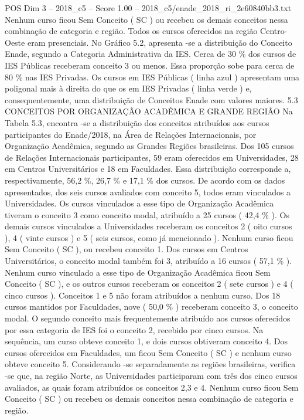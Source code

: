 \begin{textsample}{POS Dim 3 – 2018\_c5 – Score 1.00 – 2018\_c5/enade\_2018\_ri\_2e60840bb3.txt}
Nenhum curso ficou Sem Conceito ( SC ) ou recebeu os demais conceitos nessa combinação de categoria e região.
Todos os cursos oferecidos na região Centro-Oeste eram presenciais.
No Gráfico 5.2, apresenta -se a distribuição do Conceito Enade, segundo a Categoria Administrativa da IES.
Cerca de 30 \% dos cursos de IES Públicas receberam conceito 3 ou menos.
Essa proporção sobe para cerca de 80 \% nas IES Privadas.
Os cursos em IES Públicas ( linha azul ) apresentam uma poligonal mais à direita do que os em IES Privadas ( linha verde ) e, consequentemente, uma distribuição de Conceitos Enade com valores maiores. 5.3 CONCEITOS POR ORGANIZAÇÃO ACADÊMICA E GRANDE REGIÃO Na Tabela 5.3, encontra -se a distribuição dos conceitos atribuídos aos cursos participantes do Enade/2018, na Área de Relações Internacionais, por Organização Acadêmica, segundo as Grandes Regiões brasileiras.
Dos 105 cursos de Relações Internacionais participantes, 59 eram oferecidos em Universidades, 28 em Centros Universitários e 18 em Faculdades.
Essa distribuição corresponde a, respectivamente, 56,2 \%, 26,7 \% e 17,1 \% dos cursos.
De acordo com os dados apresentados, dos seis cursos avaliados com conceito 5, todos eram vinculados a Universidades.
Os cursos vinculados a esse tipo de Organização Acadêmica tiveram o conceito 3 como conceito modal, atribuído a 25 cursos ( 42,4 \% ).
Os demais cursos vinculados a Universidades receberam os conceitos 2 ( oito cursos ), 4 ( vinte cursos ) e 5 ( seis cursos, como já mencionado ).
Nenhum curso ficou Sem Conceito ( SC ), ou recebeu conceito 1.
Dos cursos em Centros Universitários, o conceito modal também foi 3, atribuído a 16 cursos ( 57,1 \% ).
Nenhum curso vinculado a esse tipo de Organização Acadêmica ficou Sem Conceito ( SC ), e os outros cursos receberam os conceitos 2 ( sete cursos ) e 4 ( cinco cursos ).
Conceitos 1 e 5 não foram atribuídos a nenhum curso.
Dos 18 cursos mantidos por Faculdades, nove ( 50,0 \% ) receberam conceito 3, o conceito modal.
O segundo conceito mais frequentemente atribuído aos cursos oferecidos por essa categoria de IES foi o conceito 2, recebido por cinco cursos.
Na sequência, um curso obteve conceito 1, e dois cursos obtiveram conceito 4.
Dos cursos oferecidos em Faculdades, um ficou Sem Conceito ( SC ) e nenhum curso obteve conceito 5.
Considerando -se separadamente as regiões brasileiras, verifica -se que, na região Norte, as Universidades participaram com três dos cinco cursos avaliados, as quais foram atribuídos os conceitos 2,3 e 4.
Nenhum curso ficou Sem Conceito ( SC ) ou recebeu os demais conceitos nessa combinação de categoria e região.

\end{textsample}
